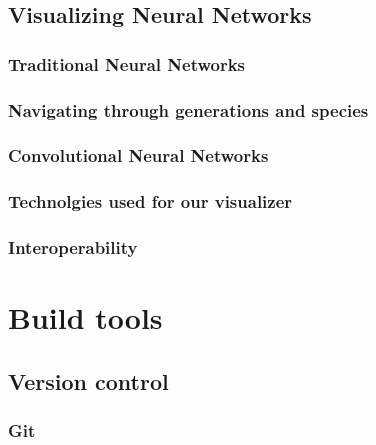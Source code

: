 \documentclass[11pt]{article}
\begin{document}
        \subsection{Visualizing Neural Networks}
			\subsubsection{Traditional Neural Networks}
		    	
		    \subsubsection{Navigating through generations and species}
			    
			    \newpage
			\subsubsection{Convolutional Neural Networks}
	            
	        \subsubsection{Technolgies used for our visualizer}
	        	
	        \subsubsection{Interoperability}
	        	
    \newpage

	\section{Build tools}
		\subsection{Version control}
			
			\subsubsection{Git}
				
\end{document}
